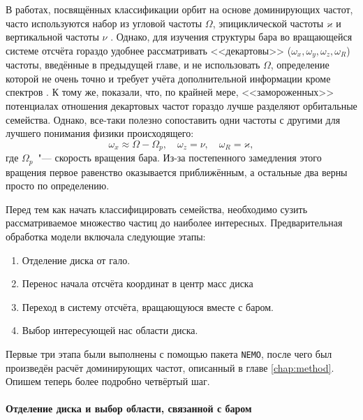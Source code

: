\documentclass[tikz]{trlnotes}
\begin{document}
В работах, посвящённых классификации орбит на основе доминирующих частот, часто используются набор из угловой
частоты $Ω$, эпициклической частоты $ϰ$ и вертикальной частоты $ν$
\citep{athanassoula2002a,ceverino2007,voglis2007}. Однако, для изучения структуры бара во вращающейся системе
отсчёта гораздо удобнее рассматривать <<декартовы>> ($ω_x, ω_y, ω_z, ω_R$) частоты, введённые в предыдущей главе, и не использовать $Ω$, определение которой не очень точно и требует учёта дополнительной информации кроме спектров
\citep{athanassoula2002,gajda2016}. К тому же, \citet{valluri2016} показали, что, по крайней мере, <<замороженных>> потенциалах  отношения декартовых частот
гораздо лучше разделяют орбитальные семейства. 
Однако, все-таки полезно сопоставить одни частоты с другими для лучшего понимания физики
происходящего: 
\[
  ω_x \approx Ω - Ω_p, \quad ω_z = ν, \quad ω_R = ϰ,
\]
где $Ω_p$~"--- скорость вращения бара. Из-за постепенного замедления этого вращения первое равенство
оказывается приближённым, а остальные два верны просто по определению.

Перед тем как начать классифицировать семейства, необходимо сузить рассматриваемое множество частиц до наиболее
интересных. Предварительная обработка модели включала следующие этапы:
\begin{enumerate}
  \item Отделение диска от гало. 
  \item Перенос начала отсчёта координат в центр масс диска
  \item Переход в систему отсчёта, вращающуюся вместе с баром.
  \item Выбор интересующей нас области диска.
\end{enumerate}
Первые три этапа были выполнены с помощью пакета \texttt{NEMO}, после чего был произведён расчёт доминирующих
частот, описанный в главе \ref{chap:method}. Опишем теперь более подробно четвёртый шаг.
\paragraph{Отделение диска и выбор области, связанной с баром}
\end{document}
